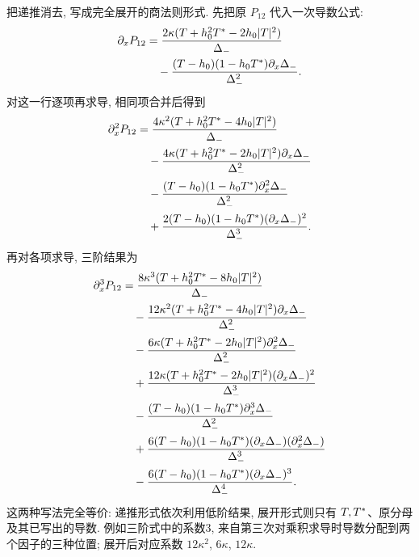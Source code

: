 \par\smallskip\noindent 把递推消去, 写成完全展开的商法则形式.\quad
先把原 $P_{12}$ 代入一次导数公式:
\begin{align*}
\partial_xP_{12}
&=\dfrac{2\kappa(T+h_0^2{T}^{*}-2h_0|T|^2)}{\Delta_-}\\
&\quad-\dfrac{(T-h_0)(1-h_0{T}^{*})\partial_x\Delta_-}{\Delta_-^2}.
\end{align*}
对这一行逐项再求导, 相同项合并后得到
\begin{align*}
\partial_x^2P_{12}
&=\dfrac{4\kappa^2(T+h_0^2{T}^{*}-4h_0|T|^2)}{\Delta_-}\\
&\quad-\dfrac{4\kappa(T+h_0^2{T}^{*}-2h_0|T|^2)
\partial_x\Delta_-}{\Delta_-^2}\\
&\quad-\dfrac{(T-h_0)(1-h_0{T}^{*})
\partial_x^2\Delta_-}{\Delta_-^2}\\
&\quad+\dfrac{2(T-h_0)(1-h_0{T}^{*})
(\partial_x\Delta_-)^2}{\Delta_-^3}.
\end{align*}
再对各项求导, 三阶结果为
\begin{align*}
\partial_x^3P_{12}
&=\dfrac{8\kappa^3(T+h_0^2{T}^{*}-8h_0|T|^2)}{\Delta_-}\\
&\quad-\dfrac{12\kappa^2(T+h_0^2{T}^{*}-4h_0|T|^2)
\partial_x\Delta_-}{\Delta_-^2}\\
&\quad-\dfrac{6\kappa(T+h_0^2{T}^{*}-2h_0|T|^2)
\partial_x^2\Delta_-}{\Delta_-^2}\\
&\quad+\dfrac{12\kappa(T+h_0^2{T}^{*}-2h_0|T|^2)
(\partial_x\Delta_-)^2}{\Delta_-^3}\\
&\quad-\dfrac{(T-h_0)(1-h_0{T}^{*})
\partial_x^3\Delta_-}{\Delta_-^2}\\
&\quad+\dfrac{6(T-h_0)(1-h_0{T}^{*})
(\partial_x\Delta_-)(\partial_x^2\Delta_-)}{\Delta_-^3}\\
&\quad-\dfrac{6(T-h_0)(1-h_0{T}^{*})
(\partial_x\Delta_-)^3}{\Delta_-^4}.
\end{align*}
这两种写法完全等价: 递推形式依次利用低阶结果, 展开形式则只有 $T,{T}^{*}$、原分母及其已写出的导数. 例如三阶式中的系数3, 来自第三次对乘积求导时导数分配到两个因子的三种位置; 展开后对应系数 $12\kappa^2$, $6\kappa$, $12\kappa$.

